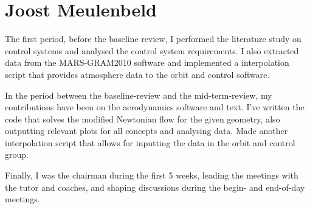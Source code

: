 \section{Joost Meulenbeld}

The first period, before the baseline review, I performed the literature study on control systems and analysed the control system requirements. I also extracted data from the MARS-GRAM2010 software and implemented a interpolation script that provides atmosphere data to the orbit and control software.

In the period between the baseline-review and the mid-term-review, my contributions have been on the aerodynamics software and text. I've written the code that solves the modified Newtonian flow for the given geometry, also outputting relevant plots for all concepts and analysing data. Made another interpolation script that allows for inputting the data in the orbit and control group.

Finally, I was the chairman during the first 5 weeks, leading the meetings with the tutor and coaches, and shaping discussions during the begin- and end-of-day meetings.